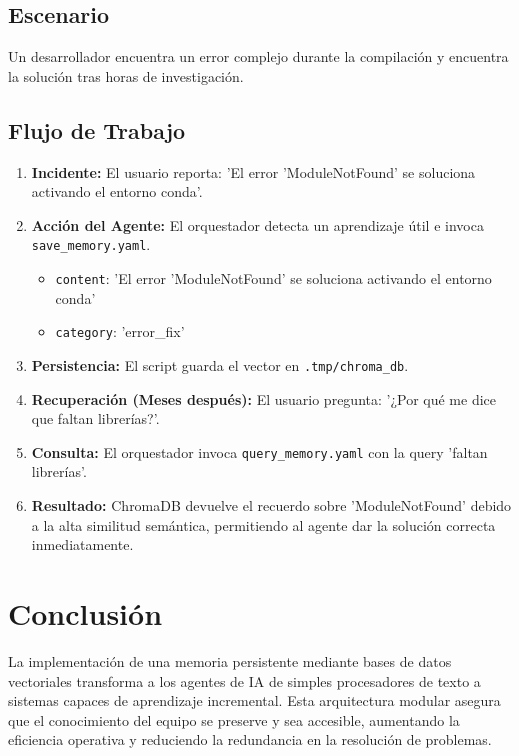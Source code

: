 \documentclass[12pt, a4paper]{article}
\begin{document}
\subsection{Escenario}
Un desarrollador encuentra un error complejo durante la compilación y encuentra la solución tras horas de investigación.

\subsection{Flujo de Trabajo}
\begin{enumerate}
    \item \textbf{Incidente:} El usuario reporta: 'El error 'ModuleNotFound' se soluciona activando el entorno conda'.
    \item \textbf{Acción del Agente:} El orquestador detecta un aprendizaje útil e invoca \texttt{save\_memory.yaml}.
    \begin{itemize}
        \item \texttt{content}: 'El error 'ModuleNotFound' se soluciona activando el entorno conda'
        \item \texttt{category}: 'error\_fix'
    \end{itemize}
    \item \textbf{Persistencia:} El script guarda el vector en \texttt{.tmp/chroma\_db}.
    \item \textbf{Recuperación (Meses después):} El usuario pregunta: '¿Por qué me dice que faltan librerías?'.
    \item \textbf{Consulta:} El orquestador invoca \texttt{query\_memory.yaml} con la query 'faltan librerías'.
    \item \textbf{Resultado:} ChromaDB devuelve el recuerdo sobre 'ModuleNotFound' debido a la alta similitud semántica, permitiendo al agente dar la solución correcta inmediatamente.
\end{enumerate}

\section{Conclusión}
La implementación de una memoria persistente mediante bases de datos vectoriales transforma a los agentes de IA de simples procesadores de texto a sistemas capaces de aprendizaje incremental. Esta arquitectura modular asegura que el conocimiento del equipo se preserve y sea accesible, aumentando la eficiencia operativa y reduciendo la redundancia en la resolución de problemas.
\end{document}

